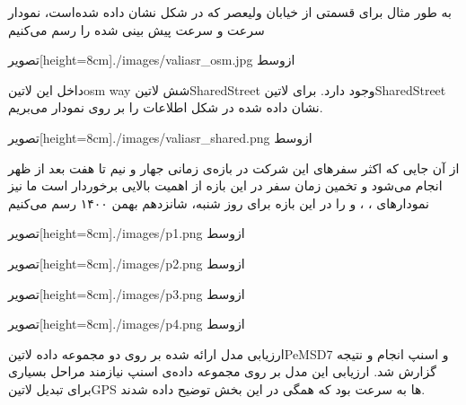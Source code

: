 به طور مثال برای قسمتی از خیابان ولیعصر که در شکل  نشان داده شده‌است، نمودار سرعت و سرعت پیش بینی شده را رسم می‌کنیم

  ‌تصویر[height=8cm]{./images/valiasr_osm.jpg}
  ‌ازوسط

داخل این ‌لاتین{osm way} شش ‌لاتین{SharedStreet} وجود دارد. برای ‌لاتین{SharedStreet} نشان داده شده در شکل  اطلاعات را بر روی نمودار می‌بریم.

  ‌تصویر[height=8cm]{./images/valiasr_shared.png}
  ‌ازوسط

از آن جایی که اکثر سفرهای این شرکت در بازه‌ی زمانی جهار و نیم تا هفت بعد از ظهر انجام می‌شود و تخمین زمان سفر در این بازه از اهمیت بالایی برخوردار است
ما نیز نمودارهای ، ،  و  را در این بازه برای روز شنبه، شانزدهم بهمن ۱۴۰۰ رسم می‌کنیم

  ‌تصویر[height=8cm]{./images/p1.png}
  ‌ازوسط

  ‌تصویر[height=8cm]{./images/p2.png}
  ‌ازوسط

  ‌تصویر[height=8cm]{./images/p3.png}
  ‌ازوسط

  ‌تصویر[height=8cm]{./images/p4.png}
  ‌ازوسط


ارزیابی مدل ارائه شده بر روی دو مجموعه داده ‌لاتین{PeMSD7} و اسنپ انجام و نتیجه گزارش شد. ارزیابی این مدل بر روی مجموعه داده‌ی اسنپ نیازمند مراحل بسیاری برای تبدیل ‌لاتین{GPS} ها به سرعت بود که همگی در این بخش توضیح داده شدند.
